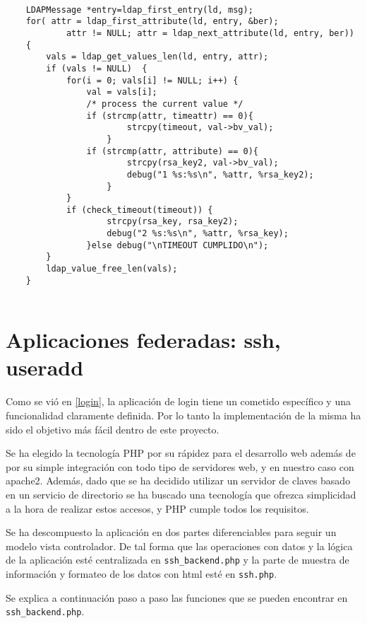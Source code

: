     \begin{lstlisting}
    
    LDAPMessage *entry=ldap_first_entry(ld, msg);
    for( attr = ldap_first_attribute(ld, entry, &ber);
            attr != NULL; attr = ldap_next_attribute(ld, entry, ber))
    {
        vals = ldap_get_values_len(ld, entry, attr);
        if (vals != NULL)  {
            for(i = 0; vals[i] != NULL; i++) {
                val = vals[i];
                /* process the current value */
                if (strcmp(attr, timeattr) == 0){
                        strcpy(timeout, val->bv_val);
                    }
                if (strcmp(attr, attribute) == 0){
                        strcpy(rsa_key2, val->bv_val);
                        debug("1 %s:%s\n", %attr, %rsa_key2);
                    }
            }
            if (check_timeout(timeout)) {
                    strcpy(rsa_key, rsa_key2);
                    debug("2 %s:%s\n", %attr, %rsa_key);
                }else debug("\nTIMEOUT CUMPLIDO\n");
        }
        ldap_value_free_len(vals);
    }


    \end{lstlisting}

    \section{Aplicaciones federadas: ssh, useradd}

    Como se vió en \ref{login}, la aplicación de login tiene un cometido
    específico y una funcionalidad claramente definida. Por lo tanto la
    implementación de la misma ha sido el objetivo más fácil dentro de este
    proyecto.

    Se ha elegido la tecnología PHP por su rápidez para el desarrollo web
    además de por su simple integración con todo tipo de servidores web, y
    en nuestro caso con apache2. Además, dado que se ha decidido utilizar
    un servidor de claves basado en un servicio de directorio se ha
    buscado una tecnología que ofrezca simplicidad a la hora de realizar
    estos accesos, y PHP cumple todos los requisitos.

    Se ha descompuesto la aplicación en dos partes diferenciables para
    seguir un modelo vista controlador. De tal forma que las operaciones
    con datos y la lógica de la aplicación esté centralizada en
    \texttt{ssh\_backend.php} y la parte de muestra de información y
    formateo de los datos con html esté en \texttt{ssh.php}.

    Se explica a continuación paso a paso las funciones que se pueden encontrar en
    \texttt{ssh\_backend.php}.
    
